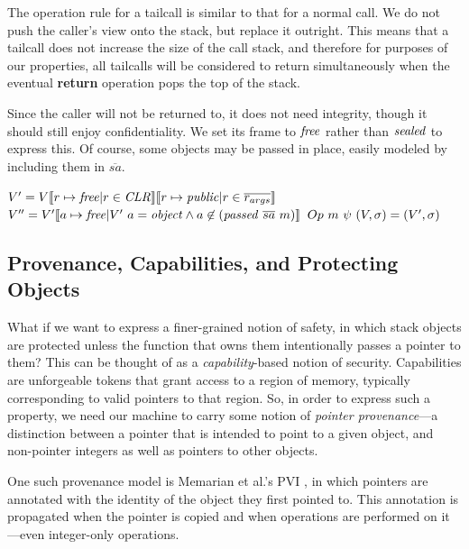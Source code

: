 \documentclass[10pt,conference]{ieeetran}%
\theoremstyle{definition}
\begin{document}
The operation rule for a tailcall is similar to that for a normal call.
We do not push the caller's view onto the stack,
but replace it outright. This means that a tailcall does not increase the size of
the call stack, and therefore for purposes of our properties, all tailcalls will
be considered to return simultaneously when the eventual {\bf return} operation
pops the top of the stack.

Since the caller will not be returned to, it does not need integrity, though
it should still enjoy confidentiality. We set its frame to \(\mathit{free}\) rather
than \(\mathit{sealed}\) to express this. Of course, some objects may be passed in place,
easily modeled by including them in \(\overline{sa}\).

             {\(V' = V \llbracket r \mapsto \mathit{free} | r \in \mathit{CLR} \rrbracket
               \llbracket r \mapsto \mathit{public} | r \in \overline{r_{args}} \rrbracket\)}
             {\(V'' = V'\llbracket a \mapsto \mathit{free} | V' ~ a = \mathit{object} \land a \not \in (\mathit{passed} ~ \overline{sa} ~ m) \rrbracket\)}
             {\(Op ~ m ~ \psi ~ (V,\sigma) =
               (V',\sigma)\)}
             
\subsection{Provenance, Capabilities, and Protecting Objects}

What if we want to express a finer-grained notion of safety, in which
stack objects are protected unless the function that owns them intentionally
passes a pointer to them? This can be thought of as a {\it capability}-based
notion of security. Capabilities are unforgeable tokens that grant access to
a region of memory, typically corresponding to valid pointers to that region.
So, in order to express such a property, we need our machine to carry some notion
of {\it pointer provenance}---a distinction between a pointer that is intended to
point to a given object, and non-pointer integers as well as pointers to other objects.

One such provenance model is Memarian et al.'s PVI \cite{}, in which pointers are
annotated with the identity of the object they first pointed to. This annotation is
propagated when the pointer is copied and when operations are performed on it---even
integer-only operations.
\end{document}
